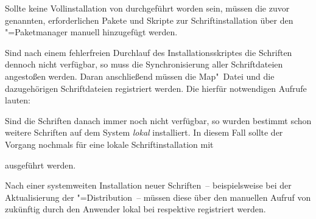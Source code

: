 %
Sollte keine Vollinstallation von  durchgeführt 
worden sein, müssen die zuvor genannten, erforderlichen Pakete und Skripte zur 
Schriftinstallation über den "=Paketmanager 
manuell hinzugefügt werden.

Sind nach einem fehlerfreien Durchlauf des Installationsskriptes die Schriften 
dennoch nicht verfügbar, so muss die Synchronisierung aller Schriftdateien 
angestoßen werden. Daran anschließend müssen die Map"~Datei und die 
dazugehörigen Schriftdateien registriert werden. Die hierfür notwendigen 
Aufrufe lauten:
%
\begin{quoting}
\newline
{}\newline
{}
\end{quoting}
%
Sind die Schriften danach immer noch nicht verfügbar, so wurden bestimmt schon 
weitere Schriften auf dem System \emph{lokal} installiert. In diesem Fall 
sollte der Vorgang nochmals für eine lokale Schriftinstallation mit 
%
\begin{quoting}
\newline
{}\newline
{}
\end{quoting}
%
ausgeführt werden. 

Nach einer systemweiten Installation neuer Schriften~-- beispielsweise bei der 
Aktualisierung der "=Distribution~-- müssen diese über den 
manuellen Aufruf von  zukünftig durch den Anwender lokal bei 
 respektive  
registriert werden.



